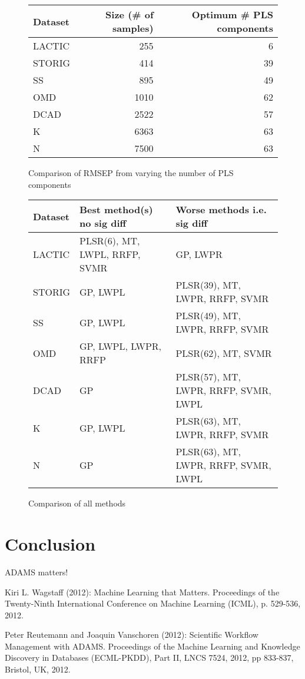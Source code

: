 \documentclass{llncs}
\begin{document}
\begin{itemize}
\begin{figure}[htb]
  \center
  \begin{tabular}{ l | r | r }
  \hline
  Dataset & Size (\# of samples) & Optimum \# PLS components \\
  \hline
  LACTIC & 255 & 6 \\
  STORIG & 414 & 39 \\
  SS & 895 & 49 \\
  OMD & 1010 & 62 \\
  DCAD & 2522 & 57 \\
  K & 6363 & 63 \\
  N & 7500 & 63 \\
  \hline
  \end{tabular}
  \caption{Comparison of RMSEP from varying the number of PLS components}
  \label{table_rmsep_pls}
\end{figure}

\begin{figure}[htb]
  \center
  \begin{tabular}{ l | l | l }
  \hline
  Dataset & Best method(s) no sig diff & Worse methods i.e. sig diff \\
  \hline
  LACTIC & PLSR(6), MT, LWPL, RRFP, SVMR & GP, LWPR \\
  STORIG & GP, LWPL & PLSR(39), MT, LWPR, RRFP, SVMR \\
  SS & GP, LWPL & PLSR(49), MT, LWPR, RRFP, SVMR \\
  OMD & GP, LWPL, LWPR, RRFP & PLSR(62), MT, SVMR \\
  DCAD & GP & PLSR(57), MT, LWPR, RRFP, SVMR, LWPL \\
  K & GP, LWPL & PLSR(63), MT, LWPR, RRFP, SVMR \\
  N & GP & PLSR(63), MT, LWPR, RRFP, SVMR, LWPL \\
  \hline
  \end{tabular}
  \caption{Comparison of all methods}
  \label{table_all_methods}
\end{figure}

\end{itemize}

\section{Conclusion}
ADAMS matters!

\begin{thebibliography}{5}

Kiri L. Wagstaff (2012):
Machine Learning that Matters.
Proceedings of the Twenty-Ninth International Conference on Machine Learning (ICML), p. 529-536, 2012.

Peter Reutemann and Joaquin Vanschoren (2012):
Scientific Workflow Management with ADAMS.
Proceedings of the Machine Learning and Knowledge Discovery in Databases (ECML-PKDD), Part II, LNCS 7524, 2012, pp 833-837, Bristol, UK, 2012.

\end{thebibliography}
\end{document}
